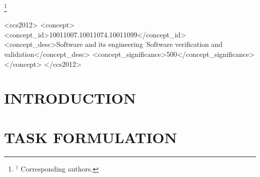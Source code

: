 \documentclass[sigconf]{acmart}
\begin{document}
\thanks{$^{\dagger}$ Corresponding authors.}


\newcommand{\benchmark}{SWD-Bench\xspace}
\newcommand{\moduleA}{High-quality data crawling and filtering stage\xspace}
\newcommand{\moduleB}{Repository-level context retrieving stage\xspace}
\newcommand{\moduleC}{Functionality-driven QA construction stage\xspace}

\newcommand{\ie}{\textit{i}.\textit{e}.\xspace}
\newcommand{\wxc}[1]{\textcolor{blue}{{#1}}}
\newcommand{\rdhu}[1]{\textcolor{darkgreen}{{#1}}}
\newcommand{\pf}[1]{\textcolor{red}{{PF: #1}}}
\newcommand{\pc}[1]{\textcolor{cyan}{{Chao: #1}}}


\begin{abstract}
\label{sec:abstract}


\end{abstract}

\begin{CCSXML}
<ccs2012>
   <concept>
       <concept_id>10011007.10011074.10011099</concept_id>
       <concept_desc>Software and its engineering~Software verification and validation</concept_desc>
       <concept_significance>500</concept_significance>
       </concept>
 </ccs2012>
\end{CCSXML}




\maketitle

\section{INTRODUCTION}
\label{sec:introduction}


\section{TASK FORMULATION}
\label{sec:task_formulation}

\end{document}
